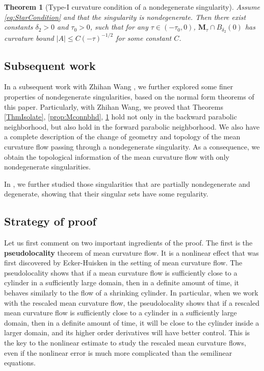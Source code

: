 \documentclass[11pt]{amsart}
\numberwithin{equation}{section}
\newtheorem{theorem}{Theorem}[section]
\numberwithin{equation}{section}
\newcommand{\dt}{\delta}
\newcommand{\bM}{\mathbf{M}}
\begin{document}
	\begin{theorem}[Type-I curvature condition of a nondegenerate singularity]\label{ThmtypeI}
		Assume \eqref{eq:StarCondition} and that the singularity is nondegenerate. Then there exist constants $\dt_2>0$ and $\tau_0>0$, such that for any $\tau\in(-\tau_0,0)$, $\bM_\tau\cap B_{\dt_2}(0)$ has curvature bound $|A|\leq C(-\tau)^{-1/2}$ for some constant $C$.
	\end{theorem}
	
	\subsection{Subsequent work}
	In a subsequent work with Zhihan Wang \cite{SunWangXue1_Passing}, we further explored some finer properties of nondegenerate singularities, based on the normal form theorems of this paper. Particularly, with Zhihan Wang, we proved that Theorems \ref{ThmIsolate}, \ref{prop:Mconnbhd}, \ref{ThmtypeI} hold not only in the backward parabolic neighborhood, but also hold in the forward parabolic neighborhood. We also have a complete description of the change of geometry and topology of the mean curvature flow passing through a nondegenerate singularity. As a consequence, we obtain the topological information of the mean curvature flow with only nondegenerate singularities.
	
	In \cite{SunWangXue2_RegSing}, we further studied those singularities that are partially nondegenerate and degenerate, showing that their singular sets have some regularity.
	
	\subsection{Strategy of proof}
	Let us first comment on two important ingredients of the proof. The first is the \textbf{pseudolocality} theorem of mean curvature flow. It is a nonlinear effect that was first discovered by Ecker-Huisken in the setting of mean curvature flow. The pseudolocality shows that if a mean curvature flow is sufficiently close to a cylinder in a sufficiently large domain, then in a definite amount of time, it behaves similarly to the flow of a shrinking cylinder. In particular, when we work with the rescaled mean curvature flow, the pseudolocality shows that if a rescaled mean curvature flow is sufficiently close to a cylinder in a sufficiently large domain, then in a definite amount of time, it will be close to the cylinder inside a larger domain, and its higher order derivatives will have better control. This is the key to the nonlinear estimate to study the rescaled mean curvature flows, even if the nonlinear error is much more complicated than the semilinear equations.
	
\end{document}
